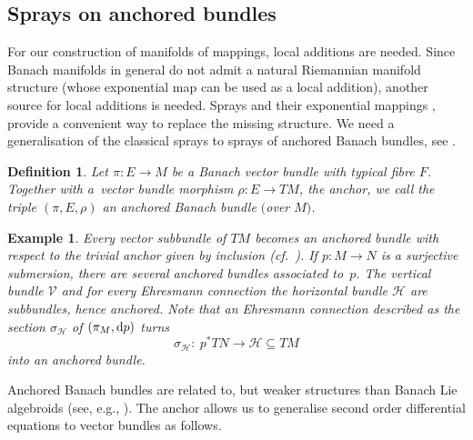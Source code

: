 \documentclass[11pt]{article}
\numberwithin{equation}{section}
\numberwithin{equation}{section}
\newtheorem{Definition}[Theorem]{Definition}
\newtheorem{Example}[Theorem]{Example}
\newcommand{\cH}{\ensuremath{\mathcal{H}}}
\newcommand{\cV}{\ensuremath{\mathcal{V}}}
\begin{document}
\subsection{Sprays on anchored bundles}
For our construction of manifolds of mappings, local additions are needed. Since Banach manifolds in general do not admit a natural Riemannian manifold structure (whose exponential map can be used as a local addition), another source for local additions is needed. Sprays and their exponential mappings \cite{La01}, provide a convenient way to replace the missing structure. We need a generalisation of the classical sprays to sprays of anchored Banach bundles, see \cite{ana11,CaP12,CaMaS20}.

\begin{Definition}
Let $\pi \colon E \rightarrow M$ be a Banach vector bundle with typical fibre $F$. Together with a~vector bundle morphism $\rho \colon E \rightarrow TM$, the \emph{anchor}, we call the triple $(\pi,E,\rho)$ an \emph{anchored Banach bundle $($over $M)$}.
\end{Definition}

\begin{Example}\label{ex:subbun_anchor}
Every vector subbundle of $TM$ becomes an anchored bundle with respect to the trivial anchor given by inclusion (cf.\ \cite[Example~3.2]{CaP12}).
If $p\colon M \rightarrow N$ is a surjective submersion, there are several anchored bundles associated to~$p$. The vertical bundle $\cV$ and for every Ehresmann connection the horizontal bundle $\cH$ are subbundles, hence anchored. Note that an Ehresmann connection described as the section $\sigma_\cH$ of $(\pi_M,{\rm d}p)$ turns
\begin{displaymath}\sigma_{\cH} \colon\ p^\ast TN \rightarrow \cH \subseteq TM
\end{displaymath}
into an anchored bundle.
\end{Example}

Anchored Banach bundles are related to, but weaker structures than Banach Lie algebroids (see, e.g., \cite{AaGaS20, BaGaP19}). The anchor allows us to generalise second order differential equations to vector bundles as follows.
\end{document}
